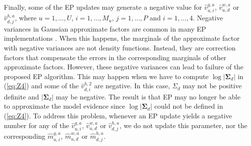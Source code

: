 Finally, some of the EP updates may generate a negative value for $\hat{v}_{u,i}^{g,a}$, 
$\hat{v}_{u,d}^{w,a}$ or $\hat{v}_{d,j}^{h,a}$, where $u = 1,\ldots,U$, $i = 1,\ldots,M_u$, $j = 1,\ldots,P$ and $i = 1,\ldots,4$.
Negative variances in Gaussian approximate factors 
are common in many EP implementations \cite{Minka2001,Minka2002}.
When this happens, the marginals of the approximate factor with negative 
variances are not density functions. Instead, they
are correction factors that compensate the errors in the corresponding marginals of other approximate factors.
However, these negative variances can lead to failure of the proposed EP algorithm.
This may happen when we have to compute $\log|\bm \Sigma_d|$ in (\ref{eq:Z4}) and some
of the $\hat{v}_{d,i}^{h,2}$ are negative. In this case, $\Sigma_d$ may not be
positive definite and $|\bm \Sigma_d|$ may be negative. The result is that EP may no longer be able to approximate the model evidence
since $\log |\bm \Sigma_d|$ could not be defined in (\ref{eq:Z4}).
To address this problem, whenever an EP update yields a negative number for any of the
$\hat{v}_{u,i}^{g,a}$, $\hat{v}_{u,d}^{w,a}$ or $\hat{v}_{d,j}^{h,a}$, we do not update this parameter, nor the corresponding
$\hat{m}_{u,i}^{g,a}$, $\hat{m}_{u,d}^{w,a}$ or $\hat{m}_{d,j}^{h,a}$.

